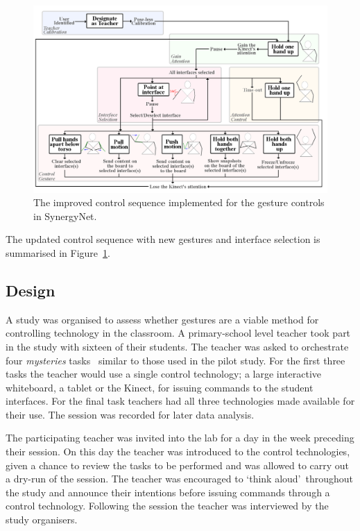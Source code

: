 \documentclass[link]{IWCOMP}
\begin{document}
\begin{figure}[t]
  \centering
  \includegraphics[width=1\textwidth]{figures/control_sequence_flow_diagram.png}
  \caption{The improved control sequence implemented for the gesture controls in SynergyNet.}
  \label{fig:controlSequenceFlowDiagram}
\end{figure}

The updated control sequence with new gestures and interface selection is summarised in Figure~\ref{fig:controlSequenceFlowDiagram}.

\subsection{Design}
\label{subsec:studyDesign}

A study was organised to assess whether gestures are a viable method for controlling technology in the classroom.
A primary-school level teacher took part in the study with sixteen of their students.
The teacher was asked to orchestrate four \textit{mysteries} tasks~\cite{AlAgha2010} similar to those used in the pilot study.
For the first three tasks the teacher would use a single control technology; a large interactive whiteboard, a tablet or the Kinect, for issuing commands to the student interfaces.
For the final task teachers had all three technologies made available for their use.
The session was recorded for later data analysis.

The participating teacher was invited into the lab for a day in the week preceding their session.
On this day the teacher was introduced to the control technologies, given a chance to review the tasks to be performed and was allowed to carry out a dry-run of the session.
The teacher was encouraged to \lq think aloud\rq\ throughout the study and announce their intentions before issuing commands through a control technology.
Following the session the teacher was interviewed by the study organisers.
\end{document}
